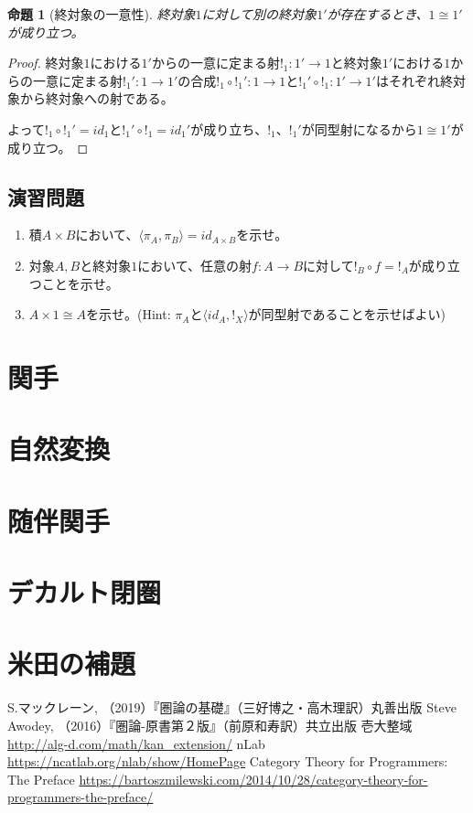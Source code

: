 \documentclass[dvipdfmx]{jsarticle}
\newcommand{\arrow}{\rightarrow}
\newcommand{\tuple}[1]{\langle #1\rangle}
\newcommand{\mor}[3]{#1:#2\arrow #3}
\newtheorem{proof}{証明}[section]
\newtheorem{prop}{命題}[section]
\begin{document}
	\begin{prop}[終対象の一意性]
		終対象$1$に対して別の終対象$1'$が存在するとき、$1\cong 1'$が成り立つ。
	\end{prop}
	\begin{proof}
		終対象$1$における$1'$からの一意に定まる射$\mor{!_1}{1'}{1}$と終対象$1'$における$1$からの一意に定まる射$\mor{{!_1}'}{1}{1'}$の合成$\mor{!_1\circ {!_1}'}{1}{1}$と$\mor{{!_1}'\circ!_1}{1'}{1'}$はそれぞれ終対象から終対象への射である。

		よって$!_1\circ {!_1}'=id_1$と${!_1}'\circ!_1=id_1'$が成り立ち、$!_1$、${!_1}'$が同型射になるから$1\cong 1'$が成り立つ。
	\end{proof}

	\subsection{演習問題}
	\begin{enumerate}
		\item 積$A\times B$において、$\tuple{\pi_A,\pi_B}=id_{A\times B}$を示せ。
		\item 対象$A,B$と終対象$1$において、任意の射$\mor{f}{A}{B}$に対して$!_B\circ f=!_A$が成り立つことを示せ。
		\item $A\times 1\cong A$を示せ。(Hint: $\pi_A$と$\tuple{id_A,!_X}$が同型射であることを示せばよい)
	\end{enumerate}
	\section{関手}
	\section{自然変換}
	\section{随伴関手}
	\section{デカルト閉圏}
	\section{米田の補題}

	\begin{thebibliography}{99}
	 S.マックレーン, （2019）『圏論の基礎』（三好博之・高木理訳）丸善出版
	 Steve Awodey, （2016）『圏論-原書第２版』（前原和寿訳）共立出版
	 壱大整域 \url{http://alg-d.com/math/kan_extension/}
	 nLab \url{https://ncatlab.org/nlab/show/HomePage}
	 Category Theory for Programmers: The Preface \url{https://bartoszmilewski.com/2014/10/28/category-theory-for-programmers-the-preface/}
	\end{thebibliography}
\end{document}
